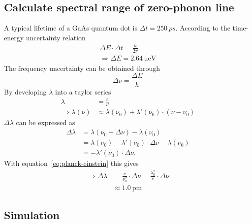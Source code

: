 \subsection{Calculate spectral range of zero-phonon line}
A typical lifetime of a GaAs quantum dot is $\Delta t = 250~ps$.
According to the time-energy uncertainty relation
\begin{align}
\Delta E \cdot \Delta t = \frac{h}{2 \pi}\\
\Rightarrow \Delta E = \SI{2.64}{\micro \electronvolt}
\end{align}
The frequency uncertainty can be obtained through
\begin{equation}
\Delta \nu = \frac{\Delta E}{h}
\end{equation}
By developing $\lambda$ into a taylor series
\begin{align}
\label{eq:planck-einstein}
\lambda &= \frac{c}{\nu}\\
\Rightarrow \lambda(\nu) &\approx \lambda(\nu_0) + \lambda'(\nu_0) \cdot (\nu - \nu_0)
\end{align}
$\Delta \lambda$ can be expressed as
\begin{align}
\Delta \lambda &= \lambda(\nu_0 - \Delta \nu) - \lambda(\nu_0)\\
 &= \lambda(\nu_0) - \lambda'(\nu_0)\cdot\Delta \nu - \lambda(\nu_0)\\
 &= - \lambda'(\nu_0)\cdot \Delta \nu.
\end{align}
With equation~\eqref{eq:planck-einstein} this gives
\begin{align}
\Rightarrow \Delta \lambda &= \frac{c}{\nu_0^2} \cdot \Delta \nu = \frac{\lambda_0^2}{c}\cdot\Delta \nu\\
\label{eq:zero-phonon-theoretical-limit}
&\approx \SI{1.0}{\pico \metre}
\end{align}

\subsection{Simulation}

